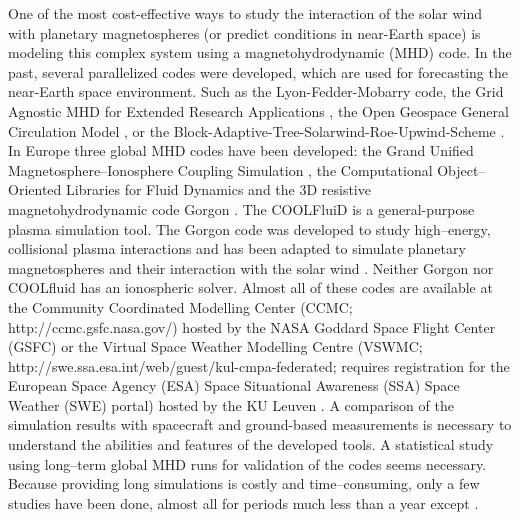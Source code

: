 \documentclass[linenumbers,draft]{agujournal}
\begin{document}
One of the most cost-effective ways to study the interaction of the solar wind with planetary magnetospheres (or predict conditions in near-Earth space) is modeling this complex system using a magnetohydrodynamic (MHD) code. In the past, several parallelized codes were developed, which are used for forecasting the near-Earth space environment. Such as the Lyon-Fedder-Mobarry \citep[LFM;][]{lyon04:_lyon_fedder_mobar_lfm_mhd} code, the Grid Agnostic MHD for Extended Research Applications \citep[GAMERA;][]{zhang19:_gamer}, the Open Geospace General Circulation Model \citep[OpenGGCM;][]{raeder08:_openg_simul_themis_mission}, or the Block-Adaptive-Tree-Solarwind-Roe-Upwind-Scheme \citep[BATS-R-US;][]{powell99:_solut_adapt_upwin_schem_ideal_magnet,toth12:_adapt}. In Europe three global MHD codes have been developed: the Grand Unified Magnetosphere--Ionosphere Coupling Simulation \citep[GUMICS$-$4;][]{janhunen12:_gumic_mhd}, the Computational Object--Oriented Libraries for Fluid Dynamics \citep[COOLFluiD;][]{lani12:_coolf_open_comput_platf_aerot} and the 3D resistive magnetohydrodynamic code Gorgon \citep{chittenden04:_x_z,ciardi07}. The COOLFluiD is a general-purpose plasma simulation tool. The Gorgon code was developed to study high--energy, collisional plasma interactions and has been adapted to simulate planetary magnetospheres and their interaction with the solar wind \citep{mejnertsen16:_global_mhd_neptun,mejnertsen18:_global_mhd_simul_earth_bow}. Neither Gorgon nor COOLfluid has an ionospheric solver. Almost all of these codes are available at the Community Coordinated Modelling Center (CCMC; http://ccmc.gsfc.nasa.gov/) hosted by the NASA Goddard Space Flight Center (GSFC) or the Virtual Space Weather Modelling Centre (VSWMC; http://swe.ssa.esa.int/web/guest/kul-cmpa-federated; requires registration for the European Space Agency (ESA) Space Situational Awareness (SSA) Space Weather (SWE) portal) hosted by the KU Leuven \citep{poedts20:_virtual_space_weath_model_centr}. A comparison of the simulation results with spacecraft and ground-based measurements is necessary to understand the abilities and features of the developed tools. A statistical study using long--term global MHD runs for validation of the codes seems necessary. Because providing long simulations is costly and time--consuming, only a few studies have been done, almost all for periods much less than a year except \citet{liemohn18:_real_time_swmf_ccmc}. 
\end{document}
